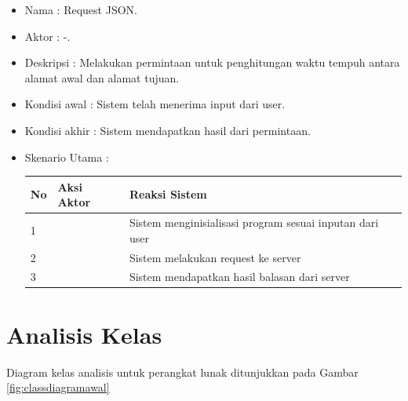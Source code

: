 \begin{enumerate}
\begin{itemize}
		\item Nama : Request JSON.
		\item Aktor : -.
		\item Deskripsi : Melakukan permintaan untuk penghitungan waktu tempuh antara alamat awal dan alamat tujuan.
		\item Kondisi awal : Sistem telah menerima input dari user. 
		\item Kondisi akhir : Sistem mendapatkan hasil dari permintaan. 
		\item Skenario Utama : \\
\begin{table}[H]
\centering
\begin{tabular}{|p{1cm}|p{4cm}|p{4cm}|}
\hline
No & Aksi Aktor    & Reaksi Sistem                             \\ \hline
1                                 &                        & Sistem menginisialisasi program sesuai inputan dari user                             \\ \hline
2                                 & &Sistem melakukan request ke server\\ \hline
3                                 & &Sistem mendapatkan hasil balasan dari server\\ \hline
\end{tabular}
\end{table}
\end{itemize}	
\end{enumerate}

\section{Analisis Kelas}
\label{sec:analisisclassdiagram}

Diagram kelas analisis untuk perangkat lunak ditunjukkan pada Gambar \ref{fig:classdiagramawal}

